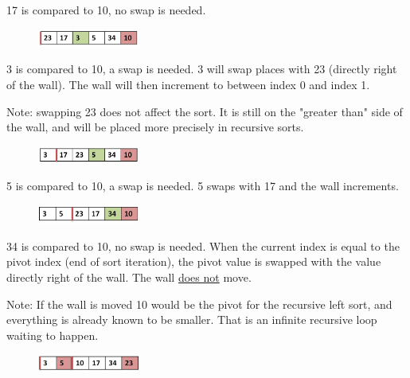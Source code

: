 17 is compared to 10, no swap is needed.

\begin{figure}[H]
\centering
\includegraphics[width=0.3\textwidth]{pictures/quick4.png}
\label{fig:quick4}
\end{figure}

3 is compared to 10, a swap is needed. 3 will swap places with 23 (directly right of the wall). The wall will then increment to between index 0 and index 1. 

Note: swapping 23 does not affect the sort. It is still on the "greater than" side of the wall, and will be placed more precisely in recursive sorts.

\begin{figure}[H]
\centering
\includegraphics[width=0.3\textwidth]{pictures/quick5.png}
\label{fig:quick5}
\end{figure}

5 is compared to 10, a swap is needed. 5 swaps with 17 and the wall increments.

\begin{figure}[H]
\centering
\includegraphics[width=0.3\textwidth]{pictures/quick6.png}
\label{fig:quick6}
\end{figure}

34 is compared to 10, no swap is needed. 
When the current index is equal to the pivot index (end of sort iteration), the pivot value is swapped with the value directly right of the wall. The wall \underline{does not} move. 

Note: If the wall is moved 10 would be the pivot for the recursive left sort, and everything is already known to be smaller. That is an infinite recursive loop waiting to happen.

\begin{figure}[H]
\centering
\includegraphics[width=0.3\textwidth]{pictures/quick7.png}
\label{fig:quick7}
\end{figure}

